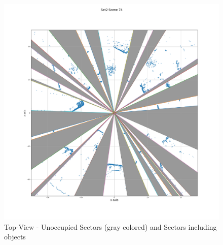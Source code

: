 \begin{figure}
\begin{center}
  \includegraphics[scale=0.5]{./images/sector-with-bg/74.pdf}
  \caption{Top-View - Unoccupied Sectors (gray colored) and  Sectors including objects}
  \label{fig:sectors}
\end{center}
\end{figure}








